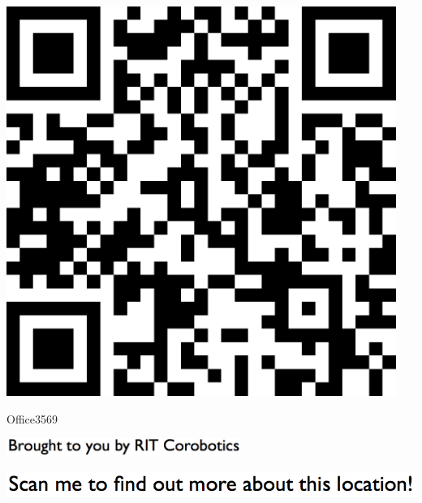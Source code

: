 \documentclass[letterpaper]{article}
\begin{document}
 \begingroup 
 \centerline{\includegraphics[scale=1,width=5in,height=5in]{Office3569.png}} 
 \endgroup 
 \vspace*{\fill} 

 \hfill{\small Office3569} 

  \vspace{0.7in} 
 
 \centerline{\includegraphics[scale=1,width=3in]{text-bottom.png}} 
 
 \pagebreak 
{} 
 \vspace*{\fill} 
 
  \centerline{\includegraphics[scale=1,width=6in]{text-top.png}} 
 
 \vspace{0.5in} 
 
\end{document}

